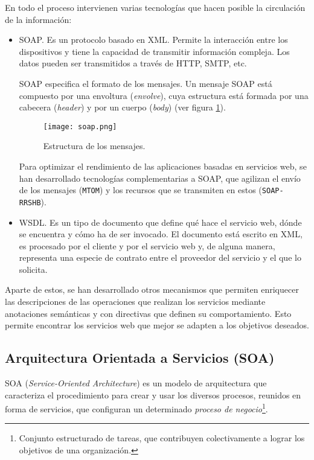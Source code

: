 En todo el proceso intervienen varias tecnologías que hacen posible la
circulación de la información:
\begin{itemize}
\item \acs{SOAP}. Es un protocolo basado en \acs{XML}. Permite la
interacción entre los dispositivos y tiene la capacidad de transmitir
información compleja. Los datos pueden ser transmitidos a través de 
\acs{HTTP}, \acs{SMTP}, etc.

\acs{SOAP} especifica el formato de los mensajes. Un mensaje \acs{SOAP} está
compuesto por una envoltura (\emph{envolve}), cuya estructura está formada
por una cabecera (\emph{header}) y por un cuerpo (\emph{body})
(ver figura \ref{fig:soap}).

  \begin{figure}[H]
    \begin{center}
      \texttt{[image: soap.png]}
      \caption{Estructura de los mensajes.}
      \label{fig:soap}
    \end{center}
  \end{figure}

Para optimizar el rendimiento de las aplicaciones basadas en servicios web, se 
han desarrollado tecnologías complementarias a \acs{SOAP}, que agilizan el 
envío de los mensajes (\texttt{MTOM}) y los recursos que se transmiten en estos 
(\texttt{SOAP-RRSHB}).

\item \acs{WSDL}. Es un tipo de documento que define qué hace el servicio web,
dónde se encuentra y cómo ha de ser invocado. El documento está escrito
en \acs{XML}, es procesado por el cliente y por el servicio web y, de alguna
manera, representa una especie de contrato entre el proveedor del servicio
y el que lo solicita.
\end{itemize}

Aparte de estos, se han desarrollado otros mecanismos que permiten 
enriquecer las descripciones de las operaciones que realizan los servicios 
mediante anotaciones semánticas y con directivas que definen su comportamiento.
Esto permite encontrar los servicios web que mejor se adapten a los objetivos 
deseados.

  \subsection{Arquitectura Orientada a Servicios (SOA)}
\acs{SOA} (\emph{Service-Oriented Architecture}) es un modelo de arquitectura 
que caracteriza el procedimiento para crear y usar los diversos procesos, 
reunidos en forma de servicios, que configuran un determinado \emph{proceso de 
negocio}\footnote{Conjunto estructurado de tareas, que contribuyen 
colectivamente a lograr los objetivos de una organización.}.

